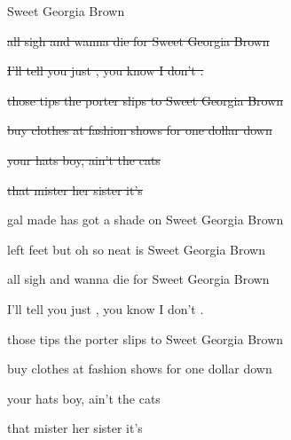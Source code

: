 \begin{SBSong}{Sweet Georgia Brown}
\begin{SBVerse}
	\sout{ all sigh and wanna die for Sweet Georgia Brown}
	
	\sout{I'll tell you just , you know I don't .}
	
	\sout{ those tips the porter slips to Sweet Georgia Brown}
	
	\sout{ buy clothes at fashion shows for one dollar down}
	
	\sout{  your hats  boy, ain't  the cats}
	
	\sout{ that mister  her sister it's}
	
	\sout{  }
  \end{SBVerse}
  \WBPageBrk
  \begin{SBVerse}
	 gal made has got a shade on Sweet Georgia Brown
	
	 left feet but oh so neat is Sweet Georgia Brown
	
	 all sigh and wanna die for Sweet Georgia Brown
	
	I'll tell you just , you know I don't .
	
	 those tips the porter slips to Sweet Georgia Brown
	
	 buy clothes at fashion shows for one dollar down

	  your hats  boy, ain't   the cats
	
	 that mister  her sister it's
	
	  
  \end{SBVerse}
\end{SBSong}




